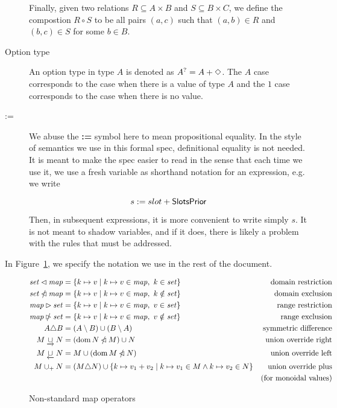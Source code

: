 \begin{description}
    Finally, given two relations $R\subseteq A\times B$ and $S\subseteq B\times C$,
    we define the compostion $R\circ S$ to be all pairs $(a, c)$ such that
    $(a, b)\in R$ and $(b, c)\in S$ for some $b\in B$.
  \item[Option type] An option type in type $A$ is denoted as $A^? = A + \Diamond$. The
    $A$ case corresponds to the case when there is a value of type $A$ and the $1$
    case corresponds to the case when there is no value.
  \item[:=] We abuse the \textbf{:=} symbol here to mean propositional equality. In the
  style of semantics we use in this formal spec, definitional equality is not needed.
  It is meant to make the spec easier to read in the sense that each time we use it,
  we use a fresh variable as shorthand notation for an expression, e.g. we write

  \[s := slot + \mathsf{SlotsPrior}\]

  Then, in subsequent expressions, it is more convenient to write simply $s$.
  It is not meant to shadow variables, and if it does, there is likely a problem with the
  rules that must be addressed.
\end{description}


In Figure~\ref{fig:notation:nonstandard}, we specify the notation we use in
the rest of the document.

\begin{figure}[htb]
  \begin{align*}
    \mathit{set} \lhd \mathit{map}
    & = \{ k \mapsto v \mid k \mapsto v \in \mathit{map}, ~ k \in \mathit{set} \}
    & \text{domain restriction}
    \\
    \mathit{set} \mathbin{\slashed{\lhd}} \mathit{map}
    & = \{ k \mapsto v \mid k \mapsto v \in \mathit{map}, ~ k \notin \mathit{set} \}
    & \text{domain exclusion}
    \\
    \mathit{map} \rhd \mathit{set}
    & = \{ k \mapsto v \mid k \mapsto v \in \mathit{map}, ~ v \in \mathit{set} \}
    & \text{range restriction}
    \\
    \mathit{map} \mathbin{\slashed{\rhd}} \mathit{set}
    & = \{ k \mapsto v \mid k \mapsto v \in \mathit{map}, ~ v \notin \mathit{set} \}
    & \text{range exclusion}
    \\
    A \triangle B
    & = (A \setminus B) \cup (B \setminus A)
    & \text{symmetric difference}
    \\
    M \mathbin{\underrightarrow\cup} N
    & = (\operatorname{dom} N \mathbin{\slashed{\lhd}} M)\cup N
    & \text{union override right}
    \\
    M \mathbin{\underleftarrow\cup} N
    & = M \cup (\operatorname{dom} M \mathbin{\slashed{\lhd}} N)
    & \text{union override left}
    \\
    M \mathbin{\cup_{+}} N
    & = (M \triangle N)
    \cup \{k\mapsto v_1+v_2\mid {k\mapsto v_1}\in M \land {k\mapsto v_2}\in N \}
    & \text{union override plus} \\
    & & \text{(for monoidal values)}\\
  \end{align*}
  \caption{Non-standard map operators}
  \label{fig:notation:nonstandard}
\end{figure}

\clearpage
